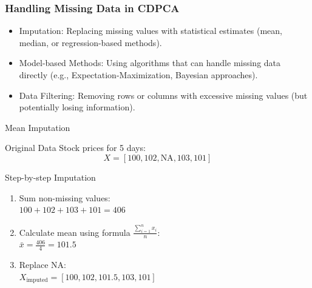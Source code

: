 \documentclass{beamer}
\begin{document}
\begin{frame}
    \frametitle{Handling Missing Data in CDPCA}


    \begin{itemize}
        \item Imputation: Replacing missing values with statistical estimates (mean, median, or regression-based methods).
        \item Model-based Methods: Using algorithms that can handle missing data directly (e.g., Expectation-Maximization, Bayesian approaches).
        \item Data Filtering: Removing rows or columns with excessive missing values (but potentially losing information).
    \end{itemize}


\end{frame}


\begin{frame}{Mean Imputation}
   \begin{block}{Original Data}
       Stock prices for 5 days:
       \[
       X = [100, 102, \text{NA}, 103, 101]
       \]
   \end{block}

   \begin{block}{Step-by-step Imputation}
       \begin{enumerate}
           \item Sum non-missing values:\\
           $100 + 102 + 103 + 101 = 406$
           \item Calculate mean using formula $\frac{\sum_{i=1}^{n} x_i}{n}$:\\
           $\bar{x} = \frac{406}{4} = 101.5$
           \item Replace NA:\\
           $X_{\text{imputed}} = [100, 102, \mathbf{101.5}, 103, 101]$
       \end{enumerate}
   \end{block}
\end{frame}
\end{document}
